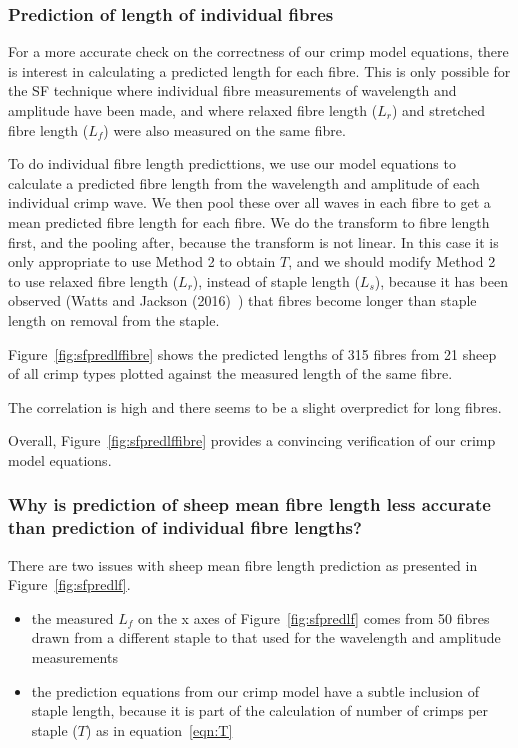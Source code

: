 \documentclass[titlepage,10pt]{article}  %
\begin{document}
\subsubsection{Prediction of length of individual fibres}
For a more accurate check on the correctness of our crimp model equations, there is interest in calculating a predicted length for each fibre. This is only possible for the SF technique where individual fibre measurements of wavelength and amplitude have been made, and where relaxed fibre length ($L_{r}$) and stretched fibre length ($L_{f}$) were also measured on the same fibre.

 To do individual fibre length predicttions, we use our model equations to calculate a predicted fibre length from the wavelength and amplitude of each individual crimp wave. We then pool these over all waves in each fibre to get a mean predicted fibre length for each fibre. We do the transform to fibre length first, and the pooling after, because the transform is not linear. In this case it is only appropriate to use Method 2 to obtain $T$, and we should modify Method 2 to use relaxed fibre length ($L_{r}$), instead of staple length ($L_{s}$), because it has been observed (Watts and Jackson (2016)~\cite{watt:16}) that fibres become longer than staple length on removal from the staple.

 Figure~\ref{fig:sfpredlffibre} shows the predicted lengths of 315 fibres from 21 sheep of all crimp types plotted against the measured length of the same fibre.


The correlation is high and there seems to be a slight overpredict for long fibres.

 Overall, Figure~\ref{fig:sfpredlffibre} provides a convincing verification of our crimp model equations.

\subsubsection{Why is prediction of sheep mean fibre length less accurate than prediction of individual fibre lengths?}
There are two issues with sheep mean fibre length prediction as presented in Figure~\ref{fig:sfpredlf}.
\begin{itemize}
\item the measured $L_{f}$ on the x axes of Figure~\ref{fig:sfpredlf} comes from 50 fibres drawn from a different staple to that used for the wavelength and amplitude measurements
\item the prediction equations from our crimp model have a subtle inclusion of staple length, because it is part of the calculation of number of crimps per staple ($T$) as in equation~\ref{eqn:T}
\end{itemize}
\end{document}
